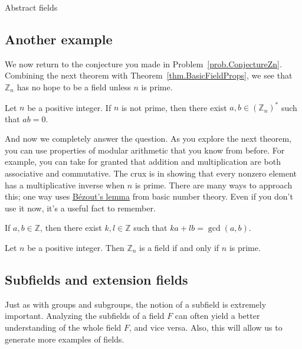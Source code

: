 \begin{section}{Abstract fields}
\subsection{Another example}
We now return to the conjecture you made in Problem~\ref{prob.ConjectureZn}. Combining the next theorem with Theorem~\ref{thm.BasicFieldProps}, we see that $\mathbb{Z}_n$ has no hope to be a field unless $n$ is prime.

\begin{theorem}
Let $n$ be a positive integer. If $n$ is not prime, then there exist $a,b\in (\mathbb{Z}_n)^*$ such that $ab=0$.
\end{theorem}

And now we completely answer the question. As you explore the next theorem, you can use properties of modular arithmetic that you know from before. For example, you can take for granted that addition and multiplication are both associative and commutative. The crux is in showing that every nonzero element has a multiplicative inverse when $n$ is prime. There are many ways to approach this; one way uses \href{https://en.wikipedia.org/wiki/Bezout\%27s_identity}{B\'ezout's lemma} from basic number theory. Even if you don't use it now, it's a  useful fact to remember.

\begin{fact}
If $a,b\in \mathbb{Z}$, then there exist $k,l\in \mathbb{Z}$ such that $ka+lb = \gcd(a,b)$.
\end{fact}

\begin{theorem}\label{thm.ZpField}
Let $n$ be a positive integer. Then $\mathbb{Z}_n$ is a field if and only if $n$ is prime.
\end{theorem}

\subsection{Subfields and extension fields}

Just as with groups and subgroups, the notion of a subfield is extremely important. Analyzing the subfields of a field $F$ can often yield a better understanding of the whole field $F$, and vice versa. Also, this will allow us to generate  more examples of fields.


\end{section}
